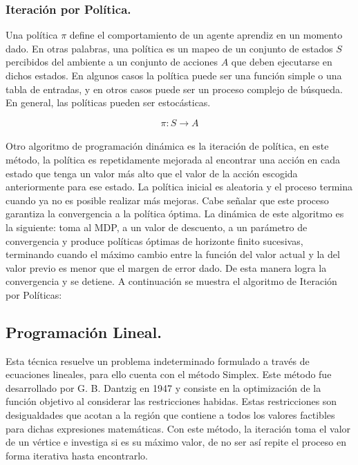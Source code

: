 \subsubsection{Iteración por Política.}

Una política $\pi$ define el comportamiento de un agente aprendiz en un momento dado. En otras palabras, una política es un mapeo de un conjunto de estados $S$ percibidos del ambiente a un conjunto de acciones $A$ que deben ejecutarse en dichos estados. En algunos casos la política puede ser una función simple o una tabla de entradas, y en otros casos puede ser un proceso complejo de búsqueda. En general, las políticas pueden ser estocásticas.

$$\pi : S \rightarrow A$$\\

Otro algoritmo de programación dinámica es la iteración de política, en este método, la política es repetidamente mejorada al encontrar una acción en cada estado que tenga un valor más alto que el valor de la acción escogida anteriormente para ese estado. La política inicial es aleatoria y el proceso termina cuando ya no es posible realizar más mejoras. Cabe señalar que este proceso garantiza la convergencia a la política óptima.
La dinámica de este algoritmo es la siguiente: toma al MDP, a un valor de descuento, a un parámetro de convergencia y produce políticas óptimas de horizonte finito sucesivas, terminando cuando el máximo cambio entre la función del valor actual y la del valor previo es menor que el margen de error dado. De esta manera logra la convergencia y se detiene. A continuación se muestra el algoritmo de Iteración por Políticas:

\subsection{Programación Lineal.}

Esta técnica resuelve un problema indeterminado formulado a través de ecuaciones lineales, para ello cuenta con el método Simplex. Este método fue desarrollado por G. B. Dantzig en 1947 y consiste en la optimización de la función objetivo al considerar las restricciones habidas. Estas restricciones son desigualdades que acotan a la región que contiene a todos los valores factibles para dichas expresiones matemáticas. Con este método, la iteración toma el valor de un vértice e investiga si es su máximo valor, de no ser así repite el proceso en forma iterativa hasta encontrarlo.

